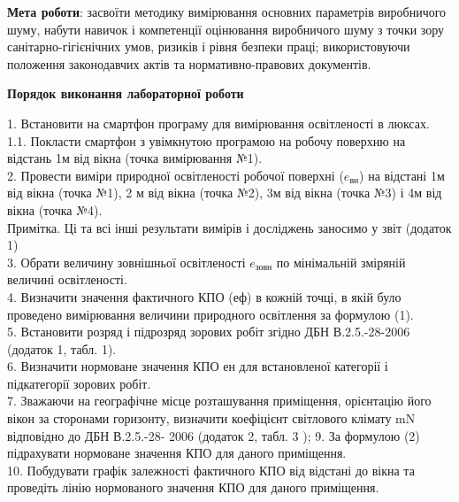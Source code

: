 \documentclass[a4paper,14pt]{extreport}
\begin{document}
\textbf{Мета роботи}: засвоїти методику вимірювання основних параметрів виробничого шуму, набути навичок і компетенції оцінювання виробничого шуму з точки зору санітарно-гігієнічних умов, ризиків і рівня безпеки праці; використовуючи положення законодавчих актів та нормативно-правових документів.\\



\begin{center}\textbf{Порядок виконання лабораторної роботи}\end{center}
\par
1. Встановити на смартфон програму для вимірювання освітленості в люксах.\\

1.1. Покласти смартфон з увімкнутою програмою на робочу поверхню на відстань 1м від вікна (точка вимірювання №1).\\

2. Провести виміри природної освітленості робочої поверхні ($e_{\text{вн}}$) на відстані 1м від вікна (точка №1), 2 м від вікна (точка №2), 3м від вікна (точка №3) і 4м від вікна (точка №4). \\

Примітка. Ці та всі інші результати вимірів і досліджень заносимо у звіт (додаток 1)\\
3. Обрати величину зовнішньої освітленості $e_{\text{зовн}}$ по мінімальній зміряній величині освітленості.\\

4. Визначити  значення  фактичного КПО (еф)	в кожній точці, в якій було проведено вимірювання величини природного освітлення за формулою (1).\\

5. Встановити розряд і підрозряд зорових робіт згідно ДБН В.2.5.-28-2006 (додаток 1, табл. 1). \\

6. Визначити  нормоване  значення КПО ен	для встановленої категорії і підкатегорії зорових робіт.\\

7. Зважаючи на географічне місце розташування приміщення, орієнтацію його вікон за сторонами горизонту, визначити коефіцієнт світлового клімату mN відповідно до ДБН В.2.5.-28- 2006 (додаток 2, табл. 3 );
9. За формулою (2) підрахувати нормоване значення КПО для даного приміщення.\\

10. Побудувати графік залежності фактичного КПО від відстані до вікна та проведіть лінію нормованого значення КПО для даного приміщення.\\
\end{document}

